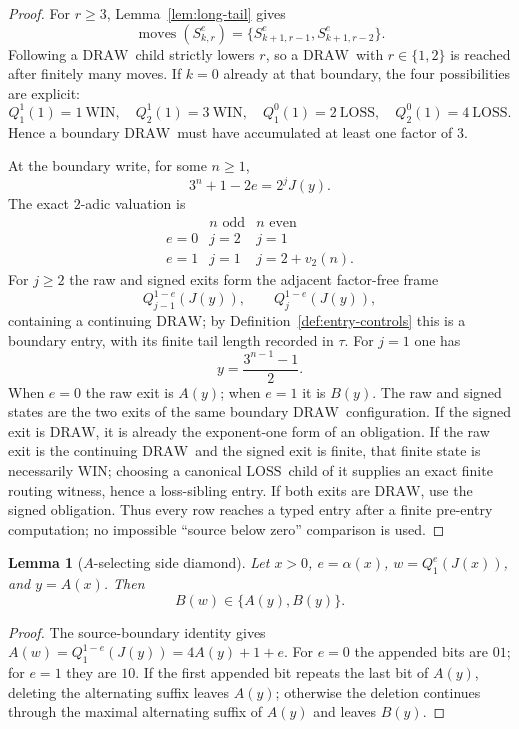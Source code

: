 \documentclass[11pt]{article}
\newtheorem{lemma}[theorem]{Lemma}
\newcommand{\WIN}{\ensuremath{\mathrm{WIN}}}
\newcommand{\LOSS}{\ensuremath{\mathrm{LOSS}}}
\newcommand{\DRAW}{\ensuremath{\mathrm{DRAW}}}
\newcommand{\Moves}{\operatorname{moves}}
\begin{document}
\begin{proof}
For $r\ge3$, Lemma~\ref{lem:long-tail} gives
\[
  \Moves(S_{k,r}^e)=\{S_{k+1,r-1}^e,S_{k+1,r-2}^e\}.
\]
Following a \DRAW\ child strictly lowers $r$, so a \DRAW\ with $r\in\{1,2\}$
is reached after finitely many moves. If $k=0$ already at that boundary, the
four possibilities are explicit:
\[
 Q_1^1(1)=1\ \WIN,\quad Q_2^1(1)=3\ \WIN,\quad
 Q_1^0(1)=2\ \LOSS,\quad Q_2^0(1)=4\ \LOSS.
\]
Hence a boundary \DRAW\ must have accumulated at least one factor of $3$.

At the boundary write, for some $n\ge1$,
\[
  3^n+1-2e=2^jJ(y).
\]
The exact $2$-adic valuation is
\[
\begin{array}{c|cc}
 &n\text{ odd}&n\text{ even}\\ \hline
 e=0&j=2&j=1\\
 e=1&j=1&j=2+v_2(n).
\end{array}
\]
For $j\ge2$ the raw and signed exits form the adjacent factor-free frame
\[
  Q_{j-1}^{1-e}(J(y)),\qquad Q_j^{1-e}(J(y)),
\]
containing a continuing \DRAW; by Definition~\ref{def:entry-controls} this is a boundary entry, with its finite tail length recorded in $\tau$. For $j=1$ one has
\[
  y=\frac{3^{n-1}-1}{2}.
\]
When $e=0$ the raw exit is $A(y)$; when $e=1$ it is $B(y)$. The raw and
signed states are the two exits of the same boundary \DRAW\ configuration.
If the signed exit is \DRAW, it is already the exponent-one form of an
obligation. If the raw exit is the continuing \DRAW\ and the signed exit is
finite, that finite state is necessarily \WIN; choosing a canonical \LOSS\
child of it supplies an exact finite routing witness, hence a loss-sibling
entry. If both exits are \DRAW, use the signed obligation. Thus every row
reaches a typed entry after a finite pre-entry computation; no impossible
``source below zero'' comparison is used.
\end{proof}

\begin{lemma}[$A$-selecting side diamond]\label{lem:a-side}
Let $x>0$, $e=\alpha(x)$, $w=Q_1^e(J(x))$, and $y=A(x)$. Then
\[
  B(w)\in\{A(y),B(y)\}.
\]
\end{lemma}

\begin{proof}
The source-boundary identity gives
$A(w)=Q_1^{1-e}(J(y))=4A(y)+1+e$. For $e=0$ the appended bits are $01$;
for $e=1$ they are $10$. If the first appended bit repeats the last bit of
$A(y)$, deleting the alternating suffix leaves $A(y)$; otherwise the deletion
continues through the maximal alternating suffix of $A(y)$ and leaves
$B(y)$.
\end{proof}
\end{document}
